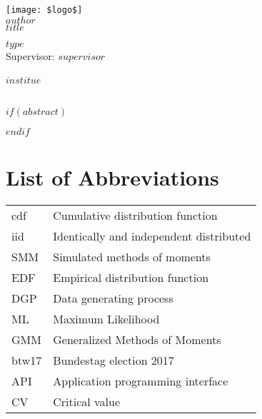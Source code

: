 \documentclass[a4paper, bibtotocnumbered,liststotoc,12pt]{scrartcl}
\theoremstyle{definition}
\theoremstyle{remark}
\numberwithin{figure}{section}
\numberwithin{table}{section}
\numberwithin{equation}{section}
\begin{document}
\setcounter{page}{0}
\begin{titlepage}
\begin{center}
\texttt{[image: \$logo\$]}\\
\vspace{\fill}
\large{$author$}\\
\Huge{$title$}
\end{center}
\vspace{\fill}
\large{$type$} \\
\large{Supervisor: $supervisor$}\\
\vspace{\fill}\\ 
$institue$\\
\\
\end{titlepage}



$if(abstract)$
  \begin{abstract}
  $abstract$
  \end{abstract}
$endif$




\newpage %
\tableofcontents %
\newpage
\thispagestyle{plain}
\listoffigures %
\listoftables %
\listofalgorithms
{}


\section*{List of Abbreviations}
\begin{tabular}{ll}
	cdf & Cumulative distribution function\\
	iid & Identically and independent distributed\\
	SMM & Simulated methods of moments\\
	EDF & Empirical distribution function\\
	DGP & Data generating process \\
	ML & Maximum Likelihood \\
	GMM & Generalized Methods of Moments\\
	btw17 & Bundestag election 2017 \\
	API & Application programming interface\\
	CV & Critical value
\end{tabular}
\newpage
\end{document}
